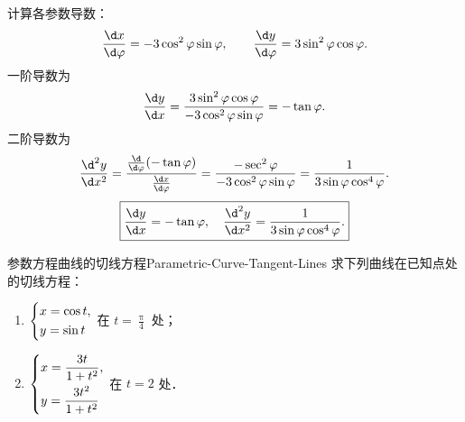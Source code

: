 \begin{solution}
    计算各参数导数：
    \begin{equation}
        \frac{\d x}{\d \varphi} = -3\cos^2\varphi\sin\varphi, \qquad \frac{\d y}{\d \varphi} = 3\sin^2\varphi\cos\varphi.
    \end{equation}
    一阶导数为
    \begin{equation}
        \frac{\d y}{\d x} = \frac{3\sin^2\varphi\cos\varphi}{-3\cos^2\varphi\sin\varphi} = -\tan\varphi.
    \end{equation}
    二阶导数为
    \begin{equation}
        \frac{\d^2 y}{\d x^2} = \frac{\frac{\d}{\d \varphi}(-\tan\varphi)}{\frac{\d x}{\d \varphi}} = \frac{-\sec^2\varphi}{-3\cos^2\varphi\sin\varphi} = \frac{1}{3\sin\varphi\cos^4\varphi}.
    \end{equation}
    \begin{equation}
        \boxed{\frac{\d y}{\d x} = -\tan\varphi, \quad \frac{\d^2 y}{\d x^2} = \frac{1}{3\sin\varphi\cos^4\varphi}.}
    \end{equation}
\end{solution}

\begin{problem}{参数方程曲线的切线方程}{Parametric-Curve-Tangent-Lines}
    求下列曲线在已知点处的切线方程：
    \begin{enumerate}
        \item $\begin{dcases} x = \cos t, \\ y = \sin t \end{dcases}$ 在 $t = \frac{\uppi}{4}$ 处；
        \item $\begin{dcases} x = \frac{3t}{1+t^2}, \\ y = \frac{3t^2}{1+t^2} \end{dcases}$ 在 $t = 2$ 处．
    \end{enumerate}
\end{problem}

